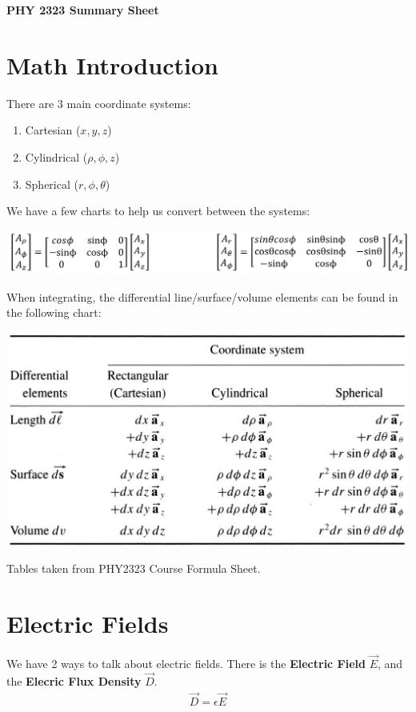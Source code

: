 \documentclass[12pt,letterpaper]{article} \usepackage{amsmath} \usepackage{graphicx} \usepackage[margin=1in]{geometry} \usepackage{longtable}  \usepackage{amssymb}
\begin{document}
	
	\begin{center}
		\Large\textbf{PHY 2323 Summary Sheet} \\
		\vspace{0.5em}
	\end{center}
	
	\section{Math Introduction}
	There are 3 main coordinate systems:
	\begin{enumerate}[]
		\item Cartesian ($x,y,z$)
		\item Cylindrical ($\rho, \phi, z$)
		\item Spherical ($r,\phi, \theta$)
	\end{enumerate}

	We have a few charts to help us convert between the systems:
	\begin{center}
		\includegraphics[width=0.8\linewidth]{trans}
	\end{center}

	When integrating, the differential line/surface/volume elements can be found in the following chart:
	\begin{center}
		\includegraphics[width=0.7\linewidth]{differential_surfaces}
	\end{center}
	
	Tables taken from PHY2323 Course Formula Sheet.
	
	\section{Electric Fields}
	We have 2 ways to talk about electric fields. There is the \textbf{Electric Field} $\vec E$, and the \textbf{Elecric Flux Density }$\vec D$.
	\begin{align*}
		\vec D = \epsilon \vec E
	\end{align*}
	
\end{document}
